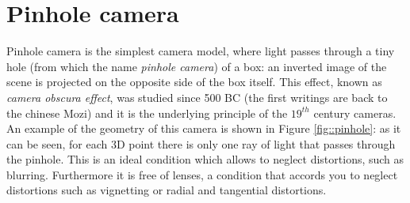 \section{Pinhole camera}
\label{sec:pinhole_camera}
Pinhole camera is the simplest camera model, where light passes through a tiny hole (from which the name \textit{pinhole camera}) of a box: an inverted image of the scene is projected on the opposite side of the box itself. This effect, known as \textit{camera obscura effect}, was studied since 500 BC (the first writings are back to the chinese Mozi) and it is the underlying principle of the $19^{th}$ century cameras. An example of the geometry of this camera is shown in Figure \ref{fig::pinhole}: as it can be seen, for each 3D point there is only one ray of light that passes through the pinhole. This is an ideal condition which allows to neglect distortions, such as blurring. Furthermore it is free of lenses, a condition that accords you to neglect distortions such as vignetting or radial and tangential distortions.
